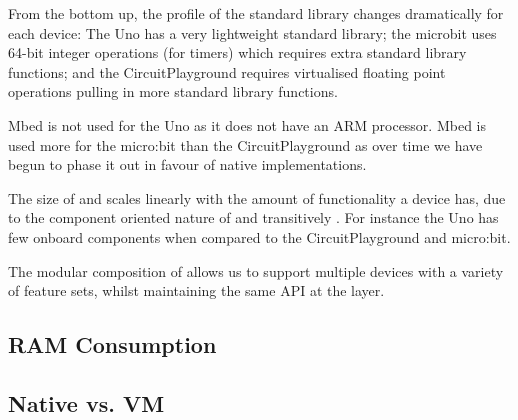 From the bottom up, the profile of the standard library changes dramatically for each device: The Uno has a very lightweight standard library; the microbit uses 64-bit integer operations (for timers) which requires extra standard library functions; and the CircuitPlayground requires virtualised floating point operations pulling in more standard library functions.

Mbed is not used for the Uno as it does not have an ARM processor. Mbed is used more for the micro:bit than the CircuitPlayground as over time we have begun to phase it out in favour of native implementations.

The size of \CO and \MC scales linearly with the amount of functionality a device has, due to the component oriented nature of \CO and transitively \MC. For instance the Uno has few onboard components when compared to the CircuitPlayground and micro:bit.

The modular composition of \CO allows us to support multiple devices with a variety of feature sets, whilst maintaining the same API at the \MC layer.

\subsection{RAM Consumption}





\subsection{\MC Native vs. \MC VM}

